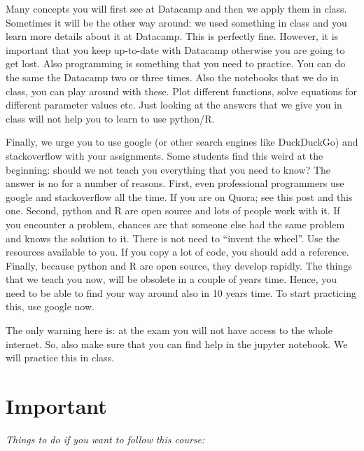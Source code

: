 \documentclass[]{book}
\begin{document}
Many concepts you will first see at Datacamp and then we apply them in class. Sometimes it will be the other way around: we used something in class and you learn more details about it at Datacamp. This is perfectly fine. However, it is important that you keep up-to-date with Datacamp otherwise you are going to get lost. Also programming is something that you need to practice. You can do the same the Datacamp two or three times. Also the notebooks that we do in class, you can play around with these. Plot different functions, solve equations for different parameter values etc. Just looking at the answers that we give you in class will not help you to learn to use python/R.

Finally, we urge you to use google (or other search engines like DuckDuckGo) and stackoverflow with your assignments. Some students find this weird at the beginning: should we not teach you everything that you need to know? The answer is no for a number of reasons. First, even professional programmers use google and stackoverflow all the time. If you are on Quora; see this post and this one. Second, python and R are open source and lots of people work with it. If you encounter a problem, chances are that someone else had the same problem and knows the solution to it. There is not need to ``invent the wheel''. Use the resources available to you. If you copy a lot of code, you should add a reference. Finally, because python and R are open source, they develop rapidly. The things that we teach you now, will be obsolete in a couple of years time. Hence, you need to be able to find your way around also in 10 years time. To start practicing this, use google now.

The only warning here is: at the exam you will not have access to the whole internet. So, also make sure that you can find help in the jupyter notebook. We will practice this in class.

\hypertarget{important-1}{%
\chapter{Important}\label{important-1}}

\emph{Things to do if you want to follow this course:}
\end{document}
